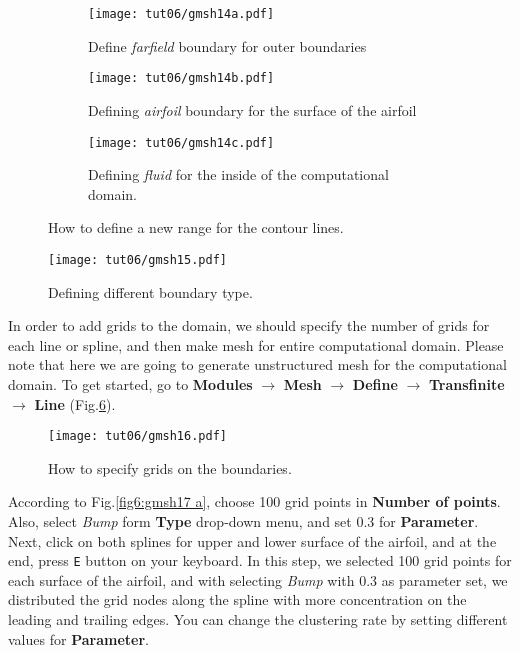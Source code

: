 \begin{figure}[htbp]
    \centering
     \begin{subfigure}[b]{.4\textwidth}
         \centering
         \texttt{[image: tut06/gmsh14a.pdf]}
         \caption{Define \textit{farfield} boundary for outer boundaries}
         \label{fig6:gmsh14 a}
     \end{subfigure}
     \hfill
     \begin{subfigure}[b]{.4\textwidth}
         \centering
         \texttt{[image: tut06/gmsh14b.pdf]}
         \caption{Defining \textit{airfoil} boundary for the surface of the airfoil}
         \label{fig6:gmsh14 b}
     \end{subfigure}  
     \hfill
     \begin{subfigure}[b]{.4\textwidth}
         \centering
         \texttt{[image: tut06/gmsh14c.pdf]}
         \caption{Defining \textit{fluid} for the inside of the computational domain.}
         \label{fig6:gmsh14 c}
     \end{subfigure} 
    \caption{How to define a new range for the contour lines.}
    \label{fig6:gmsh14}
\end{figure}
\begin{figure}[htbp]
    \centering
    \texttt{[image: tut06/gmsh15.pdf]}
    \caption{Defining different boundary type.}
    \label{fig6:gmsh15}
\end{figure}
In order to add grids to the domain, we should specify the number of grids for each line or spline, and then make mesh for entire computational domain. Please note that here we are going to generate unstructured mesh for the computational domain. To get started, go to \textbf{Modules} $\rightarrow$ \textbf{Mesh} $\rightarrow$ \textbf{Define} $\rightarrow$ \textbf{Transfinite} $\rightarrow$ \textbf{Line} (Fig.\ref{fig6:gmsh16}).
\begin{figure}[htbp]
    \centering
    \texttt{[image: tut06/gmsh16.pdf]}
    \caption{How to specify grids on the boundaries.}
    \label{fig6:gmsh16}
\end{figure}
According to Fig.\ref{fig6:gmsh17 a}, choose 100 grid points in \textbf{Number of points}. Also, select \textit{Bump} form \textbf{Type} drop-down menu, and set 0.3 for \textbf{Parameter}. Next, click on both splines for upper and lower surface of the airfoil, and at the end, press \texttt{E} button on your keyboard. In this step, we selected 100 grid points for each surface of the airfoil, and with selecting \textit{Bump} with 0.3 as parameter set, we distributed the grid nodes along the spline with more concentration on the leading and trailing edges. You can change the clustering rate by setting different values for \textbf{Parameter}.
